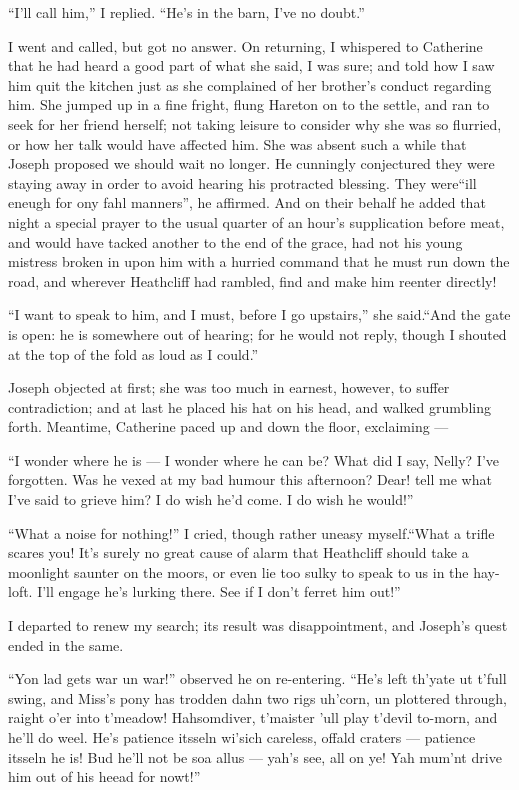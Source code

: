\par “I'll call him,” I replied. “He's in the barn, I've no doubt.”
\par I went and called, but got no answer. On returning, I whispered to Catherine that he had heard a good part of what she said, I was sure; and told how I saw him quit the kitchen just as she complained of her brother's conduct regarding him. She jumped up in a fine fright, flung Hareton on to the settle, and ran to seek for her friend herself; not taking leisure to consider why she was so flurried, or how her talk would have affected him. She was absent such a while that Joseph proposed we should wait no longer. He cunningly conjectured they were staying away in order to avoid hearing his protracted blessing. They were“ill eneugh for ony fahl manners”, he affirmed. And on their behalf he added that night a special prayer to the usual quarter of an hour's supplication before meat, and would have tacked another to the end of the grace, had not his young mistress broken in upon him with a hurried command that he must run down the road, and wherever Heathcliff had rambled, find and make him reenter directly!
\par “I want to speak to him, and I must, before I go upstairs,” she said.“And the gate is open: he is somewhere out of hearing; for he would not reply, though I shouted at the top of the fold as loud as I could.”
\par Joseph objected at first; she was too much in earnest, however, to suffer contradiction; and at last he placed his hat on his head, and walked grumbling forth. Meantime, Catherine paced up and down the floor, exclaiming —
\par “I wonder where he is — I wonder where he can be? What did I say, Nelly? I've forgotten. Was he vexed at my bad humour this afternoon? Dear! tell me what I've said to grieve him? I do wish he'd come. I do wish he would!”
\par “What a noise for nothing!” I cried, though rather uneasy myself.“What a trifle scares you! It's surely no great cause of alarm that Heathcliff should take a moonlight saunter on the moors, or even lie too sulky to speak to us in the hay-loft. I'll engage he's lurking there. See if I don't ferret him out!”
\par I departed to renew my search; its result was disappointment, and Joseph's quest ended in the same.
\par “Yon lad gets war un war!” observed he on re-entering. “He's left th'yate ut t'full swing, and Miss's pony has trodden dahn two rigs uh'corn, un plottered through, raight o'er into t'meadow! Hahsomdiver, t'maister 'ull play t'devil to-morn, and he'll do weel. He's patience itsseln wi'sich careless, offald craters — patience itsseln he is! Bud he'll not be soa allus — yah's see, all on ye! Yah mum'nt drive him out of his heead for nowt!”
